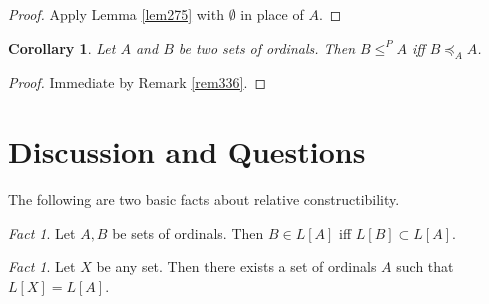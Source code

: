 \documentclass[12pt, twoside]{memoir}
\numberwithin{equation}{section}
\newtheorem{cor}[thm]{Corollary}
\theoremstyle{definition}
\theoremstyle{remark}
\newtheorem{fact}[thm]{Fact}
\theoremstyle{definition}
\theoremstyle{definition}
\theoremstyle{definition}
\theoremstyle{remark}
\begin{document}
\begin{proof}
Apply Lemma \ref{lem275} with $\emptyset$ in place of $A$. 
\end{proof}

\begin{cor}
Let $A$ and $B$ be two sets of ordinals. Then $B \leq^P A$ iff $B \preceq_A A$.
\end{cor}

\begin{proof}
Immediate by Remark \ref{rem336}.
\end{proof}

\section{Discussion and Questions}

The following are two basic facts about relative constructibility.

\begin{fact}\label{fact276}
Let $A, B$ be sets of ordinals. Then $B \in L[A]$ iff $L[B] \subset L[A]$.
\end{fact}

\begin{fact}\label{fact277}
Let $X$ be any set. Then there exists a set of ordinals $A$ such that $L[X] = L[A]$.
\end{fact}
\end{document}
